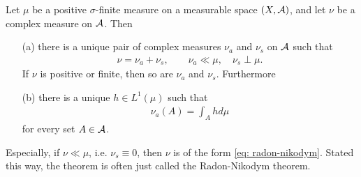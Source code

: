\begin{theorem}
Let $\mu$ be a positive $\sigma$-finite measure on a measurable space $(X,\mathcal{A})$, and let $\nu$ be a complex measure on $\mathcal{A}$. Then
\begin{itemize}
\item[(a)] there is a unique pair of complex measures $\nu_{a}$ and $\nu_{s}$ on $\mathcal{A}$ such that
\begin{align}
	\nu=\nu_{a}+\nu_{s}, \qquad \nu_{a}\ll \mu, \quad \nu_{s} \perp \mu. \label{eq: lebesgue decomposition}
\end{align}
If $\nu$ is positive or finite, then so are $\nu_{a}$ and $\nu_{s}$. Furthermore
\item[(b)] there is a unique $h\in L^{1}(\mu)$ such that
\begin{align}
	\nu_{a}(A)=\int_{A}h d\mu \label{eq: radon-nikodym}
\end{align}
for every set $A\in \mathcal{A}$.
\end{itemize}
Especially, if $\nu\ll \mu$, i.e. $\nu_{s}\equiv 0$, then $\nu$ is of the form \eqref{eq: radon-nikodym}. Stated this way, the theorem is often just called the Radon-Nikodym theorem.
\end{theorem}

